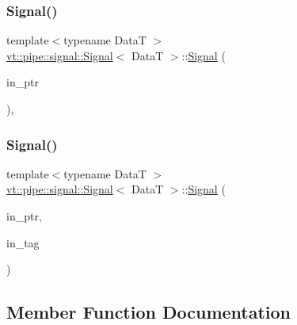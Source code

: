 \subsubsection{\texorpdfstring{Signal()}{Signal()}\hspace{0.1cm}{\footnotesize\ttfamily [4/5]}}
{\footnotesize\ttfamily template$<$typename DataT $>$ \\
\hyperlink{structvt_1_1pipe_1_1signal_1_1_signal}{vt\+::pipe\+::signal\+::\+Signal}$<$ DataT $>$\+::\hyperlink{structvt_1_1pipe_1_1signal_1_1_signal}{Signal} (\begin{DoxyParamCaption}\item[{\hyperlink{structvt_1_1pipe_1_1signal_1_1_signal_a9c8166338314e5d595575c21eaa42859}{Data\+Ptr\+Type}}]{in\+\_\+ptr }\end{DoxyParamCaption})\hspace{0.3cm}{\ttfamily [inline]}, {\ttfamily [explicit]}}

\mbox{\label{structvt_1_1pipe_1_1signal_1_1_signal_a6fd49ac7971cb93dd3caf0d079c30fed}} 
\subsubsection{\texorpdfstring{Signal()}{Signal()}\hspace{0.1cm}{\footnotesize\ttfamily [5/5]}}
{\footnotesize\ttfamily template$<$typename DataT $>$ \\
\hyperlink{structvt_1_1pipe_1_1signal_1_1_signal}{vt\+::pipe\+::signal\+::\+Signal}$<$ DataT $>$\+::\hyperlink{structvt_1_1pipe_1_1signal_1_1_signal}{Signal} (\begin{DoxyParamCaption}\item[{\hyperlink{structvt_1_1pipe_1_1signal_1_1_signal_a9c8166338314e5d595575c21eaa42859}{Data\+Ptr\+Type}}]{in\+\_\+ptr,  }\item[{\hyperlink{namespacevt_a84ab281dae04a52a4b243d6bf62d0e52}{Tag\+Type}}]{in\+\_\+tag }\end{DoxyParamCaption})\hspace{0.3cm}{\ttfamily [inline]}}



\subsection{Member Function Documentation}
\mbox{\label{structvt_1_1pipe_1_1signal_1_1_signal_a0d6606179504be4e4c02d0ea80aec823}} 
